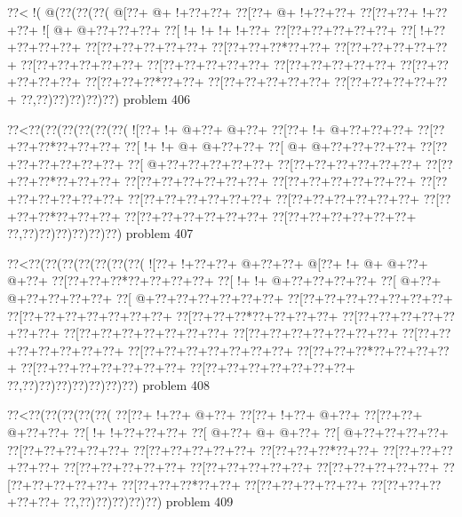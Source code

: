 \vbox{\vbox{\goo
\0??<\- !(\- @(\0??(\0??(\0??(
\- @[\0??+\- @+\- !+\0??+\0??+
\0??[\0??+\- @+\- !+\0??+\0??+
\0??[\0??+\0??+\- !+\0??+\0??+
\- ![\- @+\- @+\0??+\0??+\0??+
\0??[\- !+\- !+\- !+\- !+\0??+
\0??[\0??+\0??+\0??+\0??+\0??+
\0??[\- !+\0??+\0??+\0??+\0??+
\0??[\0??+\0??+\0??+\0??+\0??+
\0??[\0??+\0??+\0??*\0??+\0??+
\0??[\0??+\0??+\0??+\0??+\0??+
\0??[\0??+\0??+\0??+\0??+\0??+
\0??[\0??+\0??+\0??+\0??+\0??+
\0??[\0??+\0??+\0??+\0??+\0??+
\0??[\0??+\0??+\0??+\0??+\0??+
\0??[\0??+\0??+\0??*\0??+\0??+
\0??[\0??+\0??+\0??+\0??+\0??+
\0??[\0??+\0??+\0??+\0??+\0??+
\0??,\0??)\0??)\0??)\0??)\0??)
}
\hfil problem 406\hfil\break
}

\vbox{\vbox{\goo
\0??<\0??(\0??(\0??(\0??(\0??(\0??(
\- ![\0??+\- !+\- @+\0??+\- @+\0??+
\0??[\0??+\- !+\- @+\0??+\0??+\0??+
\0??[\0??+\0??+\0??*\0??+\0??+\0??+
\0??[\- !+\- !+\- @+\- @+\0??+\0??+
\0??[\- @+\- @+\0??+\0??+\0??+\0??+
\0??[\0??+\0??+\0??+\0??+\0??+\0??+
\0??[\- @+\0??+\0??+\0??+\0??+\0??+
\0??[\0??+\0??+\0??+\0??+\0??+\0??+
\0??[\0??+\0??+\0??*\0??+\0??+\0??+
\0??[\0??+\0??+\0??+\0??+\0??+\0??+
\0??[\0??+\0??+\0??+\0??+\0??+\0??+
\0??[\0??+\0??+\0??+\0??+\0??+\0??+
\0??[\0??+\0??+\0??+\0??+\0??+\0??+
\0??[\0??+\0??+\0??+\0??+\0??+\0??+
\0??[\0??+\0??+\0??*\0??+\0??+\0??+
\0??[\0??+\0??+\0??+\0??+\0??+\0??+
\0??[\0??+\0??+\0??+\0??+\0??+\0??+
\0??,\0??)\0??)\0??)\0??)\0??)\0??)
}
\hfil problem 407\hfil\break
}

\vbox{\vbox{\goo
\0??<\0??(\0??(\0??(\0??(\0??(\0??(\0??(
\- ![\0??+\- !+\0??+\0??+\- @+\0??+\0??+
\- @[\0??+\- !+\- @+\- @+\0??+\- @+\0??+
\0??[\0??+\0??+\0??*\0??+\0??+\0??+\0??+
\0??[\- !+\- !+\- @+\0??+\0??+\0??+\0??+
\0??[\- @+\0??+\- @+\0??+\0??+\0??+\0??+
\0??[\- @+\0??+\0??+\0??+\0??+\0??+\0??+
\0??[\0??+\0??+\0??+\0??+\0??+\0??+\0??+
\0??[\0??+\0??+\0??+\0??+\0??+\0??+\0??+
\0??[\0??+\0??+\0??*\0??+\0??+\0??+\0??+
\0??[\0??+\0??+\0??+\0??+\0??+\0??+\0??+
\0??[\0??+\0??+\0??+\0??+\0??+\0??+\0??+
\0??[\0??+\0??+\0??+\0??+\0??+\0??+\0??+
\0??[\0??+\0??+\0??+\0??+\0??+\0??+\0??+
\0??[\0??+\0??+\0??+\0??+\0??+\0??+\0??+
\0??[\0??+\0??+\0??*\0??+\0??+\0??+\0??+
\0??[\0??+\0??+\0??+\0??+\0??+\0??+\0??+
\0??[\0??+\0??+\0??+\0??+\0??+\0??+\0??+
\0??,\0??)\0??)\0??)\0??)\0??)\0??)\0??)
}
\hfil problem 408\hfil\break
}

\vbox{\vbox{\goo
\0??<\0??(\0??(\0??(\0??(\0??(
\0??[\0??+\- !+\0??+\- @+\0??+
\0??[\0??+\- !+\0??+\- @+\0??+
\0??[\0??+\0??+\- @+\0??+\0??+
\0??[\- !+\- !+\0??+\0??+\0??+
\0??[\- @+\0??+\- @+\- @+\0??+
\0??[\- @+\0??+\0??+\0??+\0??+
\0??[\0??+\0??+\0??+\0??+\0??+
\0??[\0??+\0??+\0??+\0??+\0??+
\0??[\0??+\0??+\0??*\0??+\0??+
\0??[\0??+\0??+\0??+\0??+\0??+
\0??[\0??+\0??+\0??+\0??+\0??+
\0??[\0??+\0??+\0??+\0??+\0??+
\0??[\0??+\0??+\0??+\0??+\0??+
\0??[\0??+\0??+\0??+\0??+\0??+
\0??[\0??+\0??+\0??*\0??+\0??+
\0??[\0??+\0??+\0??+\0??+\0??+
\0??[\0??+\0??+\0??+\0??+\0??+
\0??,\0??)\0??)\0??)\0??)\0??)
}
\hfil problem 409\hfil\break
}

